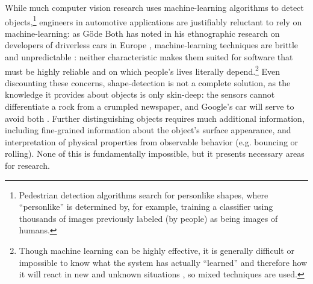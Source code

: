 

While much computer vision research uses machine-learning algorithms to detect
objects,\footnote{Pedestrian detection algorithms search for
  personlike shapes, where ``personlike'' is determined by, for
  example, training a classifier using thousands of images previously
  labeled (by people) as being images of humans.} engineers in
automotive applications are justifiably 
reluctant to rely on machine-learning: as G\"{o}de Both has noted in his
ethnographic research on developers of driverless cars in
Europe \cite{bothpt1},
machine-learning techniques are brittle and unpredictable \cite{bothpt2}: neither
characteristic makes them suited for software that must be highly
reliable and on which people's lives literally depend.\footnote{Though machine
learning can be highly effective, it is generally difficult or
impossible to know what the 
system has actually ``learned'' and therefore how it will react in new
and unknown situations \cite{bothpt2}, so mixed techniques are used.}
Even discounting these concerns, shape-detection is not a complete
solution, as the knowledge it provides about objects is only
skin-deep: the sensors cannot differentiate a rock from a crumpled
newspaper, and Google's car will serve to avoid
both \cite{gomesCircles}. Further distinguishing objects requires much
additional information,
including fine-grained information about the object's surface
appearance, and interpretation of physical properties from observable
behavior (e.g. bouncing or rolling). None of this is fundamentally
impossible, but it presents necessary areas for research.


